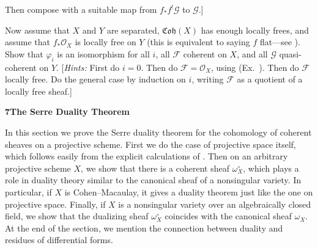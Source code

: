 {{\begin{description}[style=multiline,labelwidth=2.6em,leftmargin=2.95em,itemsep=4pt,topsep=0pt,parsep=0pt]
\begin{parts}
\[\]
Then compose with a suitable map from $f_*f^!\mathcal G$ to $\mathcal G$.]
\item Now assume that $X$ and $Y$ are separated, $\mathfrak{Coh}(X)$ has enough locally frees, and assume that $f_*\mathcal O_X$ is locally free on $Y$ (this is equivalent to saying $f$ flat---see ). Show that $\varphi_i$ is an isomorphism for all $i$, all $\mathcal F$ coherent on $X$, and all $\mathcal G$ quasi-coherent on $Y$. [\emph{Hints:} First do $i=0$. Then do $\mathcal F=\mathcal O_X$, using (Ex.~). Then do $\mathcal F$ locally free. Do the general case by induction on $i$, writing $\mathcal F$ as a quotient of a locally free sheaf.]
\end{parts}
\end{description}
}

\bigskip
\noindent\hypertarget{sec-III-7}{}\textbf{\large 7\quad The Serre Duality Theorem}\par\medskip

\noindent In this section we prove the Serre duality theorem for the cohomology of coherent sheaves on a projective scheme. First we do the case of projective space itself, which follows easily from the explicit calculations of . Then on an arbitrary projective scheme $X$, we show that there is a coherent sheaf $\omega_X^\circ$, which plays a role in duality theory similar to the canonical sheaf of a nonsingular variety. In particular, if $X$ is Cohen--Macaulay, it gives a duality theorem just like the one on projective space. Finally, if $X$ is a nonsingular variety over an algebraically closed field, we show that the dualizing sheaf $\omega_X^\circ$ coincides with the canonical sheaf $\omega_X$. At the end of the section, we mention the connection between duality and residues of differential forms.
}
